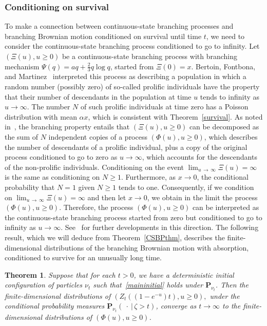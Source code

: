 \documentclass[10pt]{amsart}
\newtheorem{theo}{Theorem}[section]
\theoremstyle{definition}\newtheorem{defi}[theo]{Definition}\newtheorem{rema}[theo]{Remark}\newtheorem{exam}[theo]{Example}\newtheorem{exem}[theo]{Example}\newtheorem{nota}[theo]{Notation}
\renewcommand*\P{\mathbf{P}}
\newcommand{\1} {\mathds{1}}
\begin{document}
\subsubsection{Conditioning on survival}
To make a connection between continuous-state branching processes and branching Brownian motion conditioned on survival until time $t$, we need to consider the continuous-state branching process conditioned to go to infinity. Let $(\Xi(u), u \geq 0)$ be a continuous-state branching process with branching mechanism $\Psi(q) = aq + \frac{2}{3} q \log q$, started from $\Xi(0) = x$. Bertoin, Fontbona, and Martinez~\cite{bfm08} interpreted this process as describing a population in which a random number (possibly zero) of so-called prolific individuals have the property that their number of descendants in the population at time $u$ tends to infinity as $u \rightarrow \infty$. The number $N$ of such prolific individuals at time zero has a Poisson distribution with mean $\alpha x$, which is consistent with Theorem~\ref{survival}. As noted in~\cite[Section~3]{bfm08}, the branching property entails that $(\Xi(u), u \geq 0)$ can be decomposed as the sum of $N$ independent copies of a process $(\Phi(u), u \geq 0)$, which describes the number of descendants of a prolific individual, plus a copy of the original process conditioned to go to zero as $u \rightarrow \infty$, which accounts for the descendants of the non-prolific individuals. Conditioning on the event $\lim_{u\,\rightarrow\,\infty} \Xi(u) = \infty$ is the same as conditioning on $N \geq 1$. Furthermore, as $x \rightarrow 0$, the conditional probability that $N = 1$ given $N \geq 1$ tends to one. Consequently, if we condition on $\lim_{u\,\rightarrow\,\infty} \Xi(u) = \infty$ and then let $x \rightarrow 0$, we obtain in the limit the process $(\Phi(u), u \geq 0)$. Therefore, the process $(\Phi(u), u \geq 0)$ can be interpreted as the continuous-state branching process started from zero but conditioned to go to infinity as $u \rightarrow \infty$. See~\cite{bkm11, fm19} for further developments in this direction. The following result, which we will deduce from Theorem~\ref{CSBPthm}, describes the finite-dimensional distributions of the branching Brownian motion with absorption, conditioned to survive for an unusually long time.


\begin{theo}\label{CSBPcond}
Suppose that for each $t > 0$, we have a deterministic initial configuration of particles $\nu_t$ such that~\eqref{maininitial} holds under $\P_{\nu_t}$. Then the finite-dimensional distributions of $(Z_t((1 - e^{-u})t), u \geq 0),$ under the conditional probability measures $\P_{\nu_t}(\:\cdot\:|\,\zeta > t)$, converge as $t \rightarrow \infty$ to the finite-dimensional distributions of $(\Phi(u), u \geq 0)$.
\end{theo}
\end{document}
